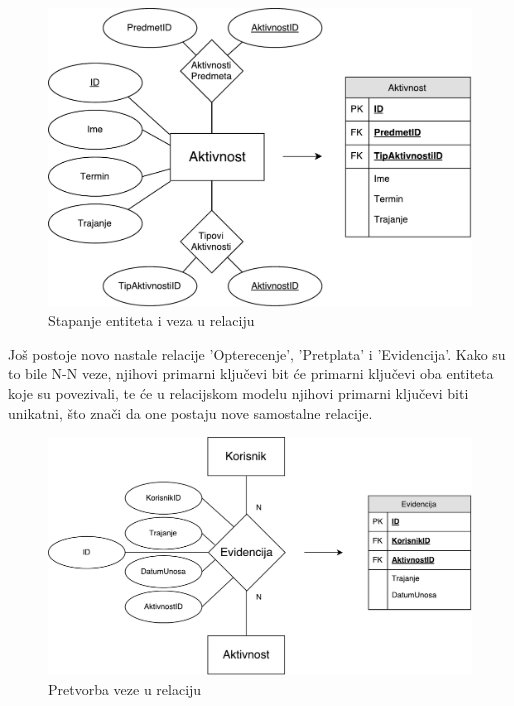 \documentclass[times, utf8, zavrsni]{fer}
\begin{document}
\begin{figure}[H]
\centering
\includegraphics[width=\textwidth,height=\textheight,keepaspectratio]{img/relacija-aktivnost.pdf}
\caption{Stapanje entiteta i veza u relaciju}
\label{fig:relacija-aktivnost}
\end{figure}

Još postoje novo nastale relacije 'Opterecenje', 'Pretplata' i 'Evidencija'. Kako su to bile N-N veze, njihovi primarni ključevi bit će primarni ključevi oba entiteta koje su povezivali, te će u relacijskom modelu njihovi primarni ključevi biti unikatni, što znači da one postaju nove samostalne relacije.

\begin{figure}[H]
\centering
\includegraphics[width=\textwidth,height=\textheight,keepaspectratio]{img/relacija-evidencija.pdf}
\caption{Pretvorba veze u relaciju}
\label{fig:relacija-evidencija}
\end{figure}
\end{document}
